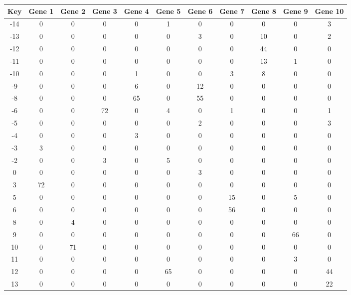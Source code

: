 \begin{tabular}{|c|c|c|c|c|c|c|c|c|c|c|}
\hline
Key & Gene 1 & Gene 2 & Gene 3 & Gene 4 & Gene 5 & Gene 6 & Gene 7 & Gene 8 & Gene 9 & Gene 10 \\
\hline
-14 & 0 & 0 & 0 & 0 & 1 & 0 & 0 & 0 & 0 & 3 \\
-13 & 0 & 0 & 0 & 0 & 0 & 3 & 0 & 10 & 0 & 2 \\
-12 & 0 & 0 & 0 & 0 & 0 & 0 & 0 & 44 & 0 & 0 \\
-11 & 0 & 0 & 0 & 0 & 0 & 0 & 0 & 13 & 1 & 0 \\
-10 & 0 & 0 & 0 & 1 & 0 & 0 & 3 & 8 & 0 & 0 \\
-9 & 0 & 0 & 0 & 6 & 0 & 12 & 0 & 0 & 0 & 0 \\
-8 & 0 & 0 & 0 & 65 & 0 & 55 & 0 & 0 & 0 & 0 \\
-6 & 0 & 0 & 72 & 0 & 4 & 0 & 1 & 0 & 0 & 1 \\
-5 & 0 & 0 & 0 & 0 & 0 & 2 & 0 & 0 & 0 & 3 \\
-4 & 0 & 0 & 0 & 3 & 0 & 0 & 0 & 0 & 0 & 0 \\
-3 & 3 & 0 & 0 & 0 & 0 & 0 & 0 & 0 & 0 & 0 \\
-2 & 0 & 0 & 3 & 0 & 5 & 0 & 0 & 0 & 0 & 0 \\
0 & 0 & 0 & 0 & 0 & 0 & 3 & 0 & 0 & 0 & 0 \\
3 & 72 & 0 & 0 & 0 & 0 & 0 & 0 & 0 & 0 & 0 \\
5 & 0 & 0 & 0 & 0 & 0 & 0 & 15 & 0 & 5 & 0 \\
6 & 0 & 0 & 0 & 0 & 0 & 0 & 56 & 0 & 0 & 0 \\
8 & 0 & 4 & 0 & 0 & 0 & 0 & 0 & 0 & 0 & 0 \\
9 & 0 & 0 & 0 & 0 & 0 & 0 & 0 & 0 & 66 & 0 \\
10 & 0 & 71 & 0 & 0 & 0 & 0 & 0 & 0 & 0 & 0 \\
11 & 0 & 0 & 0 & 0 & 0 & 0 & 0 & 0 & 3 & 0 \\
12 & 0 & 0 & 0 & 0 & 65 & 0 & 0 & 0 & 0 & 44 \\
13 & 0 & 0 & 0 & 0 & 0 & 0 & 0 & 0 & 0 & 22 \\
\hline
\end{tabular}